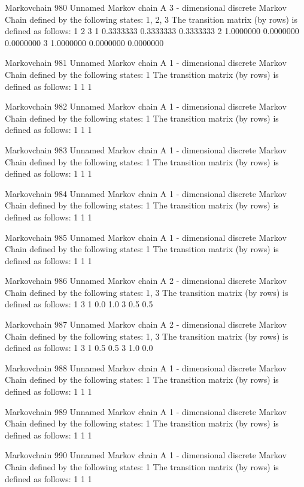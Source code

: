 \documentclass[
  nojss]{jss}
\begin{document}
\begin{CodeChunk}
\begin{CodeOutput}
Markovchain  980 
Unnamed Markov chain 
 A  3 - dimensional discrete Markov Chain defined by the following states: 
 1, 2, 3 
 The transition matrix  (by rows)  is defined as follows: 
          1         2         3
1 0.3333333 0.3333333 0.3333333
2 1.0000000 0.0000000 0.0000000
3 1.0000000 0.0000000 0.0000000

Markovchain  981 
Unnamed Markov chain 
 A  1 - dimensional discrete Markov Chain defined by the following states: 
 1 
 The transition matrix  (by rows)  is defined as follows: 
  1
1 1

Markovchain  982 
Unnamed Markov chain 
 A  1 - dimensional discrete Markov Chain defined by the following states: 
 1 
 The transition matrix  (by rows)  is defined as follows: 
  1
1 1

Markovchain  983 
Unnamed Markov chain 
 A  1 - dimensional discrete Markov Chain defined by the following states: 
 1 
 The transition matrix  (by rows)  is defined as follows: 
  1
1 1

Markovchain  984 
Unnamed Markov chain 
 A  1 - dimensional discrete Markov Chain defined by the following states: 
 1 
 The transition matrix  (by rows)  is defined as follows: 
  1
1 1

Markovchain  985 
Unnamed Markov chain 
 A  1 - dimensional discrete Markov Chain defined by the following states: 
 1 
 The transition matrix  (by rows)  is defined as follows: 
  1
1 1

Markovchain  986 
Unnamed Markov chain 
 A  2 - dimensional discrete Markov Chain defined by the following states: 
 1, 3 
 The transition matrix  (by rows)  is defined as follows: 
    1   3
1 0.0 1.0
3 0.5 0.5

Markovchain  987 
Unnamed Markov chain 
 A  2 - dimensional discrete Markov Chain defined by the following states: 
 1, 3 
 The transition matrix  (by rows)  is defined as follows: 
    1   3
1 0.5 0.5
3 1.0 0.0

Markovchain  988 
Unnamed Markov chain 
 A  1 - dimensional discrete Markov Chain defined by the following states: 
 1 
 The transition matrix  (by rows)  is defined as follows: 
  1
1 1

Markovchain  989 
Unnamed Markov chain 
 A  1 - dimensional discrete Markov Chain defined by the following states: 
 1 
 The transition matrix  (by rows)  is defined as follows: 
  1
1 1

Markovchain  990 
Unnamed Markov chain 
 A  1 - dimensional discrete Markov Chain defined by the following states: 
 1 
 The transition matrix  (by rows)  is defined as follows: 
  1
1 1


\end{CodeOutput}
\end{CodeChunk}
\end{document}
